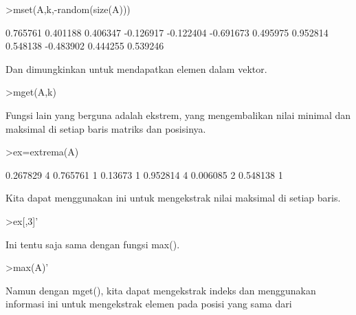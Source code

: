 \documentclass{article}
\begin{document}
\begin{eulernotebook}
\begin{eulercomment}
\begin{eulercomment}
\begin{eulercomment}
\begin{eulercomment}
\begin{eulerprompt}
>mset(A,k,-random(size(A)))
\end{eulerprompt}
\begin{euleroutput}
       0.765761      0.401188      0.406347     -0.126917 
      -0.122404     -0.691673      0.495975      0.952814 
       0.548138     -0.483902      0.444255      0.539246 
\end{euleroutput}
\begin{eulercomment}
Dan dimungkinkan untuk mendapatkan elemen dalam vektor.
\end{eulercomment}
\begin{eulerprompt}
>mget(A,k)
\end{eulerprompt}
\begin{euleroutput}
  [0.267829,  0.13673,  0.390567,  0.006085]
\end{euleroutput}
\begin{eulercomment}
Fungsi lain yang berguna adalah ekstrem, yang mengembalikan nilai
minimal dan maksimal di setiap baris matriks dan posisinya.
\end{eulercomment}
\begin{eulerprompt}
>ex=extrema(A)
\end{eulerprompt}
\begin{euleroutput}
       0.267829             4      0.765761             1 
        0.13673             1      0.952814             4 
       0.006085             2      0.548138             1 
\end{euleroutput}
\begin{eulercomment}
Kita dapat menggunakan ini untuk mengekstrak nilai maksimal di setiap
baris.
\end{eulercomment}
\begin{eulerprompt}
>ex[,3]'
\end{eulerprompt}
\begin{euleroutput}
  [0.765761,  0.952814,  0.548138]
\end{euleroutput}
\begin{eulercomment}
Ini tentu saja sama dengan fungsi max().
\end{eulercomment}
\begin{eulerprompt}
>max(A)'
\end{eulerprompt}
\begin{euleroutput}
  [0.765761,  0.952814,  0.548138]
\end{euleroutput}
\begin{eulercomment}
Namun dengan mget(), kita dapat mengekstrak indeks dan menggunakan
informasi ini untuk mengekstrak elemen pada posisi yang sama dari

\end{eulercomment}
\end{eulercomment}
\end{eulercomment}
\end{eulercomment}
\end{eulercomment}
\end{eulernotebook}
\end{document}
